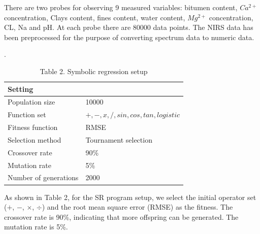 \documentclass[final,5p,times,twocolumn]{elsarticle}
\begin{document}
There are two probes for observing 9 measured variables: bitumen content, $Ca^{2+}$ concentration, Clays content, fines content, water content, $Mg^{2+}$ concentration, CL, Na and pH. At each probe there are 80000 data points. The NIRS data has been preprocessed for the purpose of converting spectrum data to numeric data.




\begin{table}[!hptb]
\centering
\caption*{Table 2. Symbolic regression setup}.
\label{my-label}
\begin{tabular}{|l|l|}
\hline
Setting               &                                \\ \hline
Population size       & 10000                          \\ \hline
Function set          & $+,-,x,/,sin,cos,tan,logistic$ \\ \hline
Fitness function      & RMSE                           \\ \hline
Selection method      & Tournament selection           \\ \hline
Crossover rate        & 90\%                           \\ \hline
Mutation rate         & 5\%                            \\ \hline
Number of generations & 2000                           \\ \hline
\end{tabular}
\end{table}

As shown in Table 2, for the SR program setup, we select the initial operator set ($+$, $-$, $\times$, $\div$) and the root mean square error (RMSE) as the fitness. The crossover rate is 90\%, indicating that more offspring can be generated. The mutation rate is 5\%.  

\end{document}
